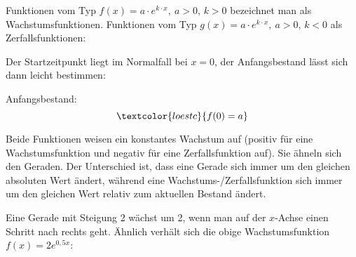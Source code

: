 Funktionen vom Typ \(f(x)=a\cdot e^{k\cdot x},\ a > 0,\,k > 0\) bezeichnet man als Wachstumsfunktionen. Funktionen vom Typ \(g(x)=a\cdot e^{k\cdot x},\ a > 0,\,k < 0\) als Zerfallsfunktionen:

\medskip

\begin{minipage}{\textwidth}
\end{minipage}

\medskip

Der Startzeitpunkt liegt im Normalfall bei \(x=0\), der Anfangsbestand lässt sich dann leicht bestimmen:

\begin{tcolorbox}Anfangsbestand:
	\[\textcolor{loestc}{f(0)=a}\]
\end{tcolorbox}

Beide Funktionen weisen ein konstantes Wachstum auf (positiv für eine Wachstumsfunktion und negativ für eine Zerfallsfunktion auf). Sie ähneln sich den Geraden. Der Unterschied ist, dass eine Gerade sich immer um den gleichen absoluten Wert ändert, während eine Wachstums-/Zerfallsfunktion sich immer um den gleichen Wert relativ zum aktuellen Bestand ändert.

Eine Gerade mit Steigung 2 wächst um 2, wenn man auf der \(x\)-Achse einen Schritt nach rechts geht. Ähnlich verhält sich die obige Wachstumsfunktion \(f(x)=2e^{0,5x}\):

